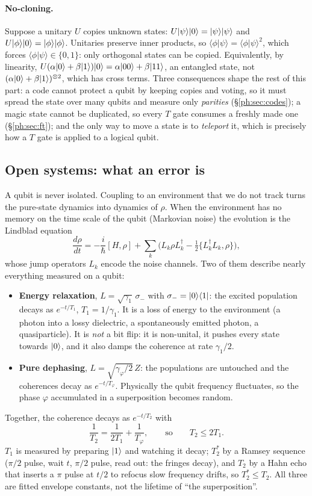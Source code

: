 \paragraph{No-cloning.} Suppose a unitary $U$ copies unknown states:
$U\lvert \psi \rangle\lvert 0 \rangle=\lvert \psi \rangle\lvert \psi \rangle$ and $U\lvert \phi \rangle\lvert 0 \rangle=\lvert \phi \rangle\lvert \phi \rangle$. Unitaries preserve inner
products, so $\langle\phi|\psi\rangle=\langle\phi|\psi\rangle^2$, which forces
$\langle\phi|\psi\rangle\in\{0,1\}$: only orthogonal states can be copied. Equivalently, by
linearity, $U(\alpha\lvert 0 \rangle+\beta\lvert 1 \rangle)\lvert 0 \rangle=\alpha\lvert 00 \rangle+\beta\lvert 11 \rangle$, an entangled state, not
$(\alpha\lvert 0 \rangle+\beta\lvert 1 \rangle)^{\otimes2}$, which has cross terms. Three consequences shape the
rest of this part: a code cannot protect a qubit by keeping copies and voting, so it must
spread the state over many qubits and measure only \emph{parities} (\S\ref{ph:sec:codes}); a
magic state cannot be duplicated, so every $T$ gate consumes a freshly made one
(\S\ref{ph:sec:ft}); and the only way to move a state is to \emph{teleport} it, which is
precisely how a $T$ gate is applied to a logical qubit.

\subsection{Open systems: what an error is}\label{ph:sec:open}

A qubit is never isolated. Coupling to an environment that we do not track turns the pure-state
dynamics into dynamics of $\rho$. When the environment has no memory on the time scale of the
qubit (Markovian noise) the evolution is the Lindblad equation
\[ \frac{d\rho}{dt}=-\frac i\hbar[H,\rho]+\sum_k\Big(L_k\rho L_k^\dagger-\tfrac12\{L_k^\dagger L_k,\rho\}\Big), \]
whose jump operators $L_k$ encode the noise channels. Two of them describe nearly everything
measured on a qubit:
\begin{itemize}\setlength\itemsep{2pt}
\item \textbf{Energy relaxation}, $L=\sqrt{\gamma_1}\,\sigma_-$ with $\sigma_-=\lvert 0 \rangle\langle 1 \rvert$: the
  excited population decays as $e^{-t/T_1}$, $T_1=1/\gamma_1$. It is a loss of energy to the
  environment (a photon into a lossy dielectric, a spontaneously emitted photon, a quasiparticle).
  It is \emph{not} a bit flip: it is non-unital, it pushes every state towards $\lvert 0 \rangle$, and it
  also damps the coherence at rate $\gamma_1/2$.
\item \textbf{Pure dephasing}, $L=\sqrt{\gamma_\varphi/2}\,Z$: the populations are untouched and
  the coherences decay as $e^{-t/T_\varphi}$. Physically the qubit frequency fluctuates, so the
  phase $\varphi$ accumulated in a superposition becomes random.
\end{itemize}
Together, the coherence decays as $e^{-t/T_2}$ with
\[ \frac1{T_2}=\frac1{2T_1}+\frac1{T_\varphi},\qquad\text{so}\qquad T_2\le2T_1 . \]
$T_1$ is measured by preparing $\lvert 1 \rangle$ and watching it decay; $T_2^*$ by a Ramsey sequence
($\pi/2$ pulse, wait $t$, $\pi/2$ pulse, read out: the fringes decay), and $T_2$ by a Hahn echo
that inserts a $\pi$ pulse at $t/2$ to refocus slow frequency drifts, so $T_2^*\le T_2$. All three
are fitted envelope constants, not the lifetime of ``the superposition''.


